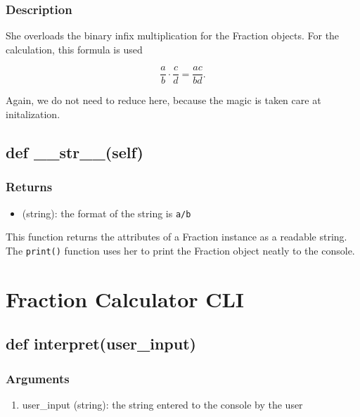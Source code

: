 \documentclass[refman]{scrartcl}
\begin{document}
\subsubsection*{Description}

She overloads the binary infix multiplication for the Fraction objects. For the calculation, this formula is used

\begin{equation}
	\frac{a}{b} \cdot \frac{c}{d} = \frac{ac}{bd} \text{.}
\end{equation}

Again, we do not need to reduce here, because the magic is taken care at initalization.

\subsection{def \_\_str\_\_(self)}

\subsubsection*{Returns}

\begin{itemize}
	\item (string): the format of the string is \texttt{a/b}
\end{itemize}

This function returns the attributes of a Fraction instance as a readable string. The \texttt{print()} function uses her to print the Fraction object neatly to the console.

\section{Fraction Calculator CLI}

\subsection{def interpret(user\_input)}

\subsubsection*{Arguments}

\begin{enumerate}
	\item user\_input (string): the string entered to the console by the user
\end{enumerate}
\end{document}

